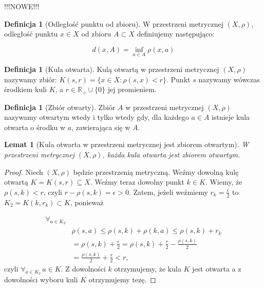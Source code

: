 \documentclass[licencjacka]{pwr_wmat_praca_dyplomowa}
\theoremstyle{plain}
\numberwithin{theorem}{chapter}
\newtheorem{lemma}[theorem]{Lemat}
\theoremstyle{definition}
\numberwithin{theorem}{chapter}
\newtheorem{definition}[theorem]{Definicja}
\begin{document}
{\color{red} !!!NOWE!!!
\begin{definition}[Odległość punktu od zbioru]
\label{definicja_odleglosci_punktu_od_zbioru}
W przestrzeni metrycznej $(X, \rho),$ odległość punktu $x \in X$ od zbioru $A \subset X$ definiujemy następująco:

$$d(x, A) = \inf_{a \in A} \rho(x, a)$$
\end{definition}
}

\begin{definition}[Kula otwarta]
Kulą otwartą w przestrzeni metrycznej $(X, \rho)$ nazywamy zbiór: $K(s, r) = \{x \in X: \rho(s, x) < r\}$.
Punkt $s$ nazywamy wówczas środkiem kuli $K$, a $r \in \mathbb{R}_+ \cup \{0\}$ jej promieniem.
\end{definition}

\begin{definition}[Zbiór otwarty]
Zbiór $A$ w przestrzeni metrycznej $(X, \rho)$ nazywamy otwartym wtedy i tylko wtedy gdy, dla każdego $a \in A$ istnieje kula otwarta o środku w $a$, zawierająca się w $A$.
\end{definition}

\begin{lemma}[Kula otwarta w przestrzeni metrycznej jest zbiorem otwartym]\label{kula_otwarta_jest_zbiorem_otwartym}
W przestrzeni metrycznej $(X, \rho)$, każda kula otwarta jest zbiorem otwartym.
\end{lemma}

\begin{proof}
Niech $(X, \rho)$ będzie przestrzenią metryczną. Weźmy dowolną kulę otwartą $K = K(s, r) \subseteq X$. Weźmy teraz dowolny punkt $k \in K$. Wiemy, że $\rho(s, k) < r$, czyli $r - \rho(s, k) = \epsilon > 0$. Zatem, jeżeli weźmiemy $r_k = \frac{\epsilon}{2}$ to $K_2 = K(k, r_k) \subset K$, ponieważ 

\begin{equation}
\begin{aligned}
\forall_{a \in K_2} \\
& \rho(s, a) \leq \rho(s, k) + \rho(k, a) \leq \rho(s, k) + r_k \\
& = \rho(s, k) + \frac{\epsilon}{2} = \rho(s, k) + \frac{r}{2} - \frac{\rho(s, k)}{2} \\
& = \frac{\rho(s, k)}{2} + \frac{r}{2} < r,
\end{aligned}
\end{equation}
czyli $\forall_{a \in K_2} \, a \in K.$ Z dowolności $k$ otrzymujemy, że kula $K$ jest otwarta a z dowolności wyboru kuli $K$ otrzymujemy tezę.
\end{proof}
\end{document}
